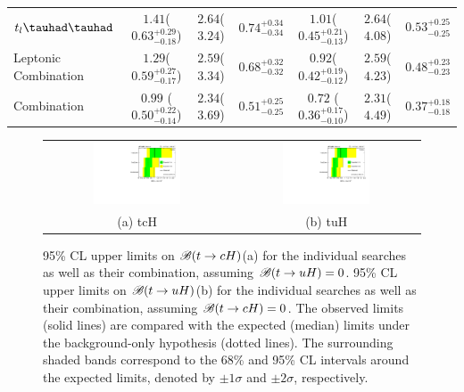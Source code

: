 \documentclass[PAPER, coverpage, atlasdraft=true, texlive=2016, UKenglish]{\ATLASLATEXPATH atlasdoc}
\providecommand{\DIFaddendFL}{} %
\begin{document}
\begin{table}[t!]
\begin{center}
{\begin{tabular}{lcccccc}
$t_l\thadhad$                   &$1.41$($0.63^{+0.29}_{-0.18}$) &$2.64$($3.24$)   &$0.74^{+0.34}_{-0.34}$  & $1.01$($0.45^{+0.21}_{-0.13}$) & $2.64$($4.08$)  &$0.53^{+0.25}_{-0.25}$\\
Leptonic Combination            &$1.29$($0.59^{+0.27}_{-0.17}$) &$2.59$($3.34$)   &$0.68^{+0.32}_{-0.32}$  & $0.92$($0.42^{+0.19}_{-0.12}$) & $2.59$($4.23$)  &$0.48^{+0.23}_{-0.23}$\\
\midrule
Combination                     &$0.99$ ($0.50^{+0.22}_{-0.14}$)&$2.34$($3.69$)   &$0.51^{+0.25}_{-0.25}$ & $0.72$ ($0.36^{+0.17}_{-0.10}$)& $2.31$($4.49$)&$0.37^{+0.18}_{-0.18}$  \\
\bottomrule\bottomrule
\end{tabular}
}
\DIFaddendFL \label{tab:limits_summary}
\end{center}
\end{table}






\begin{figure}[h!]
\begin{center}
\begin{tabular}{@{}cc@{}}
\includegraphics[width=0.49\textwidth]{figures/tcH_Limits.pdf}&
\includegraphics[width=0.49\textwidth]{figures/tuH_Limits.pdf}\\
(a) tcH & (b) tuH \\
\end{tabular}
\caption{\small {95\% CL upper limits on $\mathscr{B}(t\to cH)$(a) for the individual searches as well as their
combination, assuming $\mathscr{B}(t\to uH)=0$. 95\% CL upper limits on $\mathscr{B}(t\to uH)$(b) for the individual searches as well as their
combination, assuming $\mathscr{B}(t\to cH)=0$. The observed limits (solid lines) are compared with the 
expected (median) limits under the background-only hypothesis (dotted lines). The surrounding shaded bands correspond to the 68\% and 95\% CL intervals around the expected limits, 
denoted by $\pm 1\sigma$ and $\pm 2\sigma$, respectively.
}}
\label{fig:limits_combo_1D_hc} 
\end{center}
\end{figure}
\end{document}
